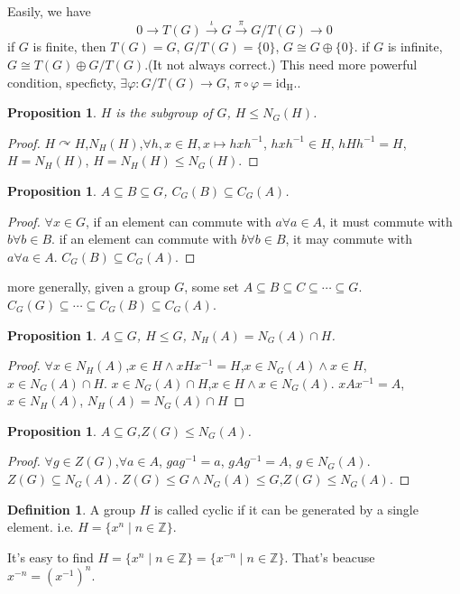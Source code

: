 \documentclass[10pt,a4paper]{article}
\newtheorem{proposition}[theorem]{Proposition}
\theoremstyle{definition}
\newtheorem{definition}[theorem]{Definition}
\begin{document}
Easily, we have
\[0\longrightarrow T(G)\overset{\iota}\longrightarrow G\overset{\pi}\longrightarrow G/T(G)\longrightarrow0\]
if $G$ is finite, then $T(G)=G$, $G/T(G)=\{0\}$, $G\cong G\oplus\{0\}$.
if $G$ is infinite, $G\cong T(G)\oplus G/T(G)$.(It not always correct.)
This need more powerful condition, specficty, $\exists\varphi:G/T(G)\to G$, $\pi\circ\varphi=\mathrm{id_H.}$.
\begin{proposition}
    $H$ is the subgroup of $G$, $H\le N_G(H)$.
\end{proposition}
\begin{proof}
    $H\curvearrowright H$,$N_H(H)$,$\forall h,x\in H,x\mapsto hxh^{-1}$, $hxh^{-1}\in H$, $hHh^{-1}=H$, $H=N_{H}(H)$, $H=N_H(H)\le N_G(H)$.
\end{proof}
\begin{proposition}
    $A\subseteq B\subseteq G$, $C_G(B)\subseteq C_G(A)$.
\end{proposition}
\begin{proof}
    $\forall x\in G$, if an element can commute with $a\forall a\in A$, it must commute with $b\forall b\in B$.
    if an element can commute with $b\forall b\in B$, it may commute with $a\forall a\in A$. $C_G(B)\subseteq C_G(A)$.
\end{proof}
more generally, given a group $G$, some set $A\subseteq B\subseteq C\subseteq\cdots\subseteq G$. $C_G(G)\subseteq\cdots\subseteq C_G(B)\subseteq C_G(A)$.
\begin{proposition}
    $A\subseteq G$, $H\le G$, $N_H(A)=N_G(A)\cap H$.
\end{proposition}
\begin{proof}
    $\forall x\in N_H(A)$,$x\in H\land xHx^{-1}=H$,$x\in N_G(A)\land x\in H$,$x\in N_G(A)\cap H$. $x\in N_G(A)\cap H$,$x\in H\land x\in N_G(A)$. $xAx^{-1}=A$,$x\in N_H(A)$, $N_H(A)=N_G(A)\cap H$
\end{proof}
\begin{proposition}
    $A\subseteq G$,$Z(G)\le N_G(A)$.
\end{proposition}
\begin{proof}
    $\forall g\in Z(G)$,$\forall a\in A$, $gag^{-1}=a$, $gAg^{-1}=A$, $g\in N_G(A)$. $Z(G)\subseteq N_G(A)$. $Z(G)\le G\land N_G(A)\le G$,$Z(G)\le N_G(A)$.
\end{proof}
\begin{definition}
    A group $H$ is called cyclic if it can be generated by a single element. i.e. $H=\{x^n\mid n\in\mathbb{Z}\}$. 
\end{definition}
It's easy to find $H=\{x^n\mid n\in\mathbb{Z}\}=\{x^{-n}\mid n\in\mathbb{Z}\}$. That's beacuse $x^{-n}=(x^{-1})^n$.
\end{document}
